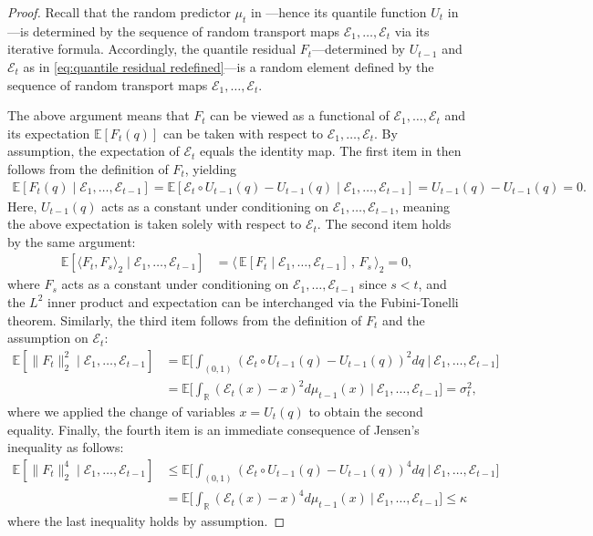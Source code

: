 \documentclass[a4paper, 11pt]{article}
\newcommand{\R}{\mathbb{R}}
\newcommand{\E}{\mathbb E}
\newcommand{\T}{\mathcal E}
\theoremstyle{definition}
\begin{document}
\begin{proof} 
    Recall that the random predictor $\mu_{t}$ in ---hence its quantile function $U_{t}$ in ---is determined by the sequence of random transport maps $\T_1, \dots, \T_{t}$ via its iterative formula.
    Accordingly, the quantile residual $F_{t}$---determined by $U_{t-1}$ and $\T_{t}$ as in \eqref{eq:quantile residual redefined}---is a random element defined by the sequence of random transport maps $\T_1, \dots, \T_{t}$.

    The above argument means that $F_t$ can be viewed as a functional of $\T_1, \dots, \T_{t}$ and its expectation $\E[ F_t(q) ]$ can be taken with respect to $\T_1, \dots, \T_{t}$.
	By assumption, the expectation of $\T_t$ equals the identity map.
    The first item in  then follows from the definition of $F_{t}$, yielding
	\begin{align}
		\E[ F_{t}(q) \mid \T_1, \dots, \T_{t-1} ] = \E[ \T_{t} \circ U_{t-1}(q) - U_{t-1}(q) \mid \T_1, \dots, \T_{t-1}] = U_{t-1}(q) - U_{t-1}(q) = 0 .
	\end{align}
    Here, $U_{t-1}(q)$ acts as a constant under conditioning on $\T_1, \dots, \T_{t-1}$, meaning the above expectation is taken solely with respect to $\T_t$.
    The second item holds by the same argument:
	\begin{align}
		\E[ \langle F_{t}, F_{s} \rangle_2 \mid \T_1, \dots, \T_{t-1} ] & = \big\langle \,\E[ F_{t} \mid \T_1, \dots, \T_{t-1} ] \, , \, F_{s} \, \big\rangle_2 = 0 ,
	\end{align}
    where $F_s$ acts as a constant under conditioning on $\T_1, \dots, \T_{t-1}$ since $s < t$, and the $L^2$ inner product and expectation can be interchanged via the Fubini-Tonelli theorem.
	Similarly, the third item follows from the definition of $F_{t}$ and the assumption on $\T_{t}$:
	\begin{align}
		\E[ \| F_{t} \|_2^2 \mid \T_1, \dots, \T_{t-1} ] & = \E\bigg[ \int_{(0,1)} \left( \T_{t} \circ U_{t-1}(q) - U_{t-1}(q) \right)^2 dq ~\bigg|~ \T_1, \dots, \T_{t-1} \bigg] \\
        & = \E\bigg[ \int_{\R} \left( \T_{t}(x) - x \right)^2 d \mu_{t-1}(x) ~\bigg|~ \T_1, \dots, \T_{t-1} \bigg] = \sigma_{t}^2 ,
	\end{align}
    where we applied the change of variables $x = U_t(q)$ to obtain the second equality.
	Finally, the fourth item is an immediate consequence of Jensen's inequality as follows:
	\begin{align}
		\E\left[ \| F_{t} \|_2^4 \mid \T_1, \dots, \T_{t-1} \right] & \le \E\bigg[ \int_{(0,1)} \left( \T_{t} \circ U_{t-1}(q) - U_{t-1}(q) \right)^4 dq ~\bigg|~ \T_1, \dots, \T_{t-1} \bigg] \\
        & = \E\bigg[ \int_{\R} \left( \T_{t}(x) - x \right)^4 d \mu_{t-1}(x) ~\bigg|~ \T_1, \dots, \T_{t-1} \bigg] \le \kappa
	\end{align}
	where the last inequality holds by assumption.
	

\end{proof}
\end{document}
